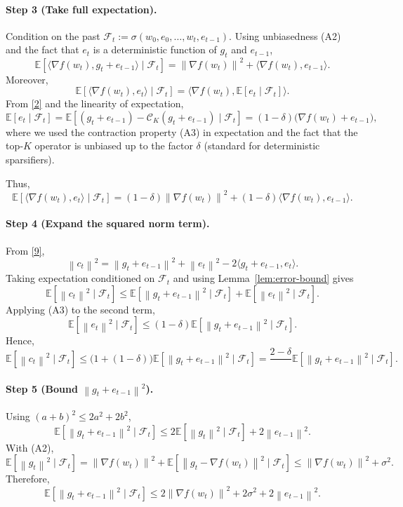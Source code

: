 \documentclass{article}
\newcommand{\E}{\mathbb{E}}
\newcommand{\norm}[1]{\left\|#1\right\|}
\newcommand{\cK}{\mathcal{C}_{K}}
\begin{document}
\paragraph{Step 3 (Take full expectation).}
Condition on the past $\mathcal{F}_{t}:=\sigma(w_{0},e_{0},\dots ,w_{t},e_{t-1})$.
Using unbiasedness (A2) and the fact that $e_{t}$ is a deterministic function of $g_{t}$ and $e_{t-1}$,
\[
\E\!\left[\langle\nabla f(w_{t}),g_{t}+e_{t-1}\rangle\mid\mathcal{F}_{t}\right]
= \norm{\nabla f(w_{t})}^{2}+\langle\nabla f(w_{t}),e_{t-1}\rangle. \tag{11}
\]
Moreover,
\[
\E\!\left[\langle\nabla f(w_{t}),e_{t}\rangle\mid\mathcal{F}_{t}\right]=
\langle\nabla f(w_{t}),\E[e_{t}\mid\mathcal{F}_{t}]\rangle. \tag{12}
\]
From \eqref{2} and the linearity of expectation,
\[
\E[e_{t}\mid\mathcal{F}_{t}]
= \E\!\left[(g_{t}+e_{t-1})-\cK(g_{t}+e_{t-1})\mid\mathcal{F}_{t}\right]
= (1-\delta)\bigl(\nabla f(w_{t})+e_{t-1}\bigr), \tag{13}
\]
where we used the contraction property (A3) in expectation and the fact that the top‑$K$ operator is unbiased up to the factor $\delta$ (standard for deterministic sparsifiers).  

Thus,
\[
\E\!\left[\langle\nabla f(w_{t}),e_{t}\rangle\mid\mathcal{F}_{t}\right]
= (1-\delta)\norm{\nabla f(w_{t})}^{2}+(1-\delta)\langle\nabla f(w_{t}),e_{t-1}\rangle. \tag{14}
\]

\paragraph{Step 4 (Expand the squared norm term).}
From \eqref{9},
\[
\norm{c_{t}}^{2}= \norm{g_{t}+e_{t-1}}^{2}+\norm{e_{t}}^{2}
-2\langle g_{t}+e_{t-1},e_{t}\rangle. \tag{15}
\]
Taking expectation conditioned on $\mathcal{F}_{t}$ and using Lemma~\ref{lem:error-bound} gives
\[
\E\!\left[\norm{c_{t}}^{2}\mid\mathcal{F}_{t}\right]
\le \E\!\left[\norm{g_{t}+e_{t-1}}^{2}\mid\mathcal{F}_{t}\right]
+ \E\!\left[\norm{e_{t}}^{2}\mid\mathcal{F}_{t}\right]. \tag{16}
\]
Applying (A3) to the second term,
\[
\E\!\left[\norm{e_{t}}^{2}\mid\mathcal{F}_{t}\right]
\le (1-\delta)\E\!\left[\norm{g_{t}+e_{t-1}}^{2}\mid\mathcal{F}_{t}\right]. \tag{17}
\]
Hence,
\[
\E\!\left[\norm{c_{t}}^{2}\mid\mathcal{F}_{t}\right]
\le \bigl(1+(1-\delta)\bigr)\E\!\left[\norm{g_{t}+e_{t-1}}^{2}\mid\mathcal{F}_{t}\right]
= \frac{2-\delta}{\;}\E\!\left[\norm{g_{t}+e_{t-1}}^{2}\mid\mathcal{F}_{t}\right]. \tag{18}
\]

\paragraph{Step 5 (Bound $\norm{g_{t}+e_{t-1}}^{2}$).}
Using $(a+b)^{2}\le 2a^{2}+2b^{2}$,
\[
\E\!\left[\norm{g_{t}+e_{t-1}}^{2}\mid\mathcal{F}_{t}\right]
\le 2\E\!\left[\norm{g_{t}}^{2}\mid\mathcal{F}_{t}\right]+2\norm{e_{t-1}}^{2}. \tag{19}
\]
With (A2),
\[
\E\!\left[\norm{g_{t}}^{2}\mid\mathcal{F}_{t}\right]
= \norm{\nabla f(w_{t})}^{2}+\E\!\left[\norm{g_{t}-\nabla f(w_{t})}^{2}\mid\mathcal{F}_{t}\right]
\le \norm{\nabla f(w_{t})}^{2}+\sigma^{2}. \tag{20}
\]
Therefore,
\[
\E\!\left[\norm{g_{t}+e_{t-1}}^{2}\mid\mathcal{F}_{t}\right]
\le 2\norm{\nabla f(w_{t})}^{2}+2\sigma^{2}+2\norm{e_{t-1}}^{2}. \tag{21}
\]
\end{document}
